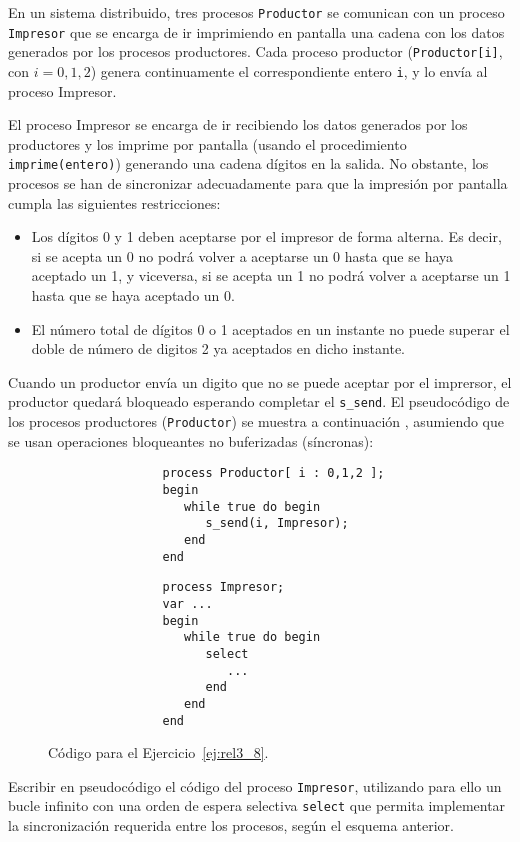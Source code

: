 \begin{ejercicio}\label{ej:rel3_8}
    En un sistema distribuido, tres procesos \verb|Productor| se comunican con un proceso \verb|Impresor| que se encarga de ir imprimiendo en pantalla una cadena con los datos generados por los procesos productores. Cada proceso productor (\verb|Productor[i]|, con $i=0,1,2$) genera continuamente el correspondiente entero \verb|i|, y lo envía al proceso Impresor.

    El proceso Impresor se encarga de ir recibiendo los datos generados por los productores y los imprime por pantalla (usando el procedimiento \verb|imprime(entero)|) generando una cadena dígitos en la salida. No obstante, los procesos se han de sincronizar adecuadamente para que la impresión por pantalla cumpla las siguientes restricciones:
    \begin{itemize}
        \item Los dígitos 0 y 1 deben aceptarse por el impresor de forma alterna. Es decir, si se acepta un 0 no podrá volver a aceptarse un 0 hasta que se haya aceptado un 1, y viceversa, si se acepta un 1 no podrá volver a aceptarse un 1 hasta que se haya aceptado un 0.
        \item El número total de dígitos 0 o 1 aceptados en un instante no puede superar el doble de número de digitos 2 ya aceptados en dicho instante.
    \end{itemize}
    Cuando un productor envía un digito que no se puede aceptar por el imprersor, el productor quedará bloqueado esperando completar el \verb|s_send|. El pseudocódigo de los procesos productores (\verb|Productor|) se muestra a continuación , asumiendo que se usan operaciones bloqueantes no buferizadas (síncronas):
    \begin{figure}[H]
        \centering
        \setlength{\columnsep}{1cm}
        \begin{multicols}{2}
            \begin{verbatim}
                process Productor[ i : 0,1,2 ];
                begin
                   while true do begin
                      s_send(i, Impresor);
                   end
                end
            \end{verbatim}
            \begin{verbatim}
                process Impresor;
                var ...
                begin
                   while true do begin
                      select
                         ...
                      end
                   end
                end
            \end{verbatim}
        \end{multicols}
        \caption{Código para el Ejercicio~\ref{ej:rel3_8}.}
        \label{fig:cod_8}
    \end{figure}
    Escribir en pseudocódigo el código del proceso \verb|Impresor|, utilizando para ello un bucle infinito con una orden de espera selectiva \verb|select| que permita implementar la sincronización requerida entre los procesos, según el esquema anterior.
\end{ejercicio}

